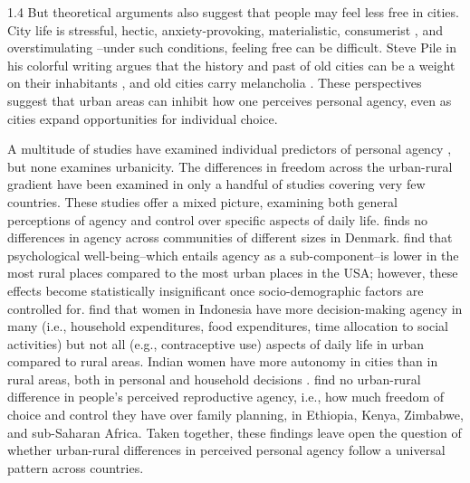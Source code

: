 \documentclass[10pt, letterpaper]{article}
\begin{document}
\begin{spacing}{1.4}
But theoretical arguments also suggest that people may feel less free in cities. City life is stressful, hectic, anxiety-provoking, materialistic, consumerist \citep{aokCityBook15}, and overstimulating \citep{simmel03,lederbogen11}--under such conditions, feeling free can be difficult.
Steve Pile in his colorful writing argues that the history and past of old cities can be a weight on their inhabitants \citep{pile05,pile05B,pile99}, and old cities carry melancholia \citep{pile05B}. %
 These perspectives suggest that urban areas can inhibit how one perceives personal agency, even as cities expand opportunities for individual choice.

A multitude of studies have examined individual predictors of personal agency %
  \citep[e.g.,][]{aok_free_from_to,pitlik2016free,nikolaev2016give}, but none examines urbanicity. %
 The differences in freedom across the urban-rural gradient have been examined in only a handful of studies covering very few countries. These studies offer a
 mixed picture, examining both general perceptions of agency and control over specific aspects of daily life. \citet{lolle2023differences} finds no differences in agency across communities of different sizes in Denmark. %
\citet{atherton2024rural} find that psychological well-being--which entails
agency as a sub-component--is lower in the most rural places compared to the
most urban places in the USA; however, these effects become statistically
insignificant once socio-demographic factors are controlled
for. \citet{kusnali2025rural} find that women in Indonesia have more
decision-making agency in many (i.e., household expenditures, food expenditures,
time allocation to social activities) but not all (e.g., contraceptive use)
aspects of daily life in urban compared to rural areas. Indian women have more
autonomy in cities than in rural areas, both in personal and household decisions
\citep{mishra2014relative}.  
\citet{baage2024attitudes,baage2026reproductive} 
 find no urban-rural difference in people's
perceived reproductive agency, i.e., how much freedom of choice and control they
have over family planning, in Ethiopia, Kenya, Zimbabwe,
 and sub-Saharan Africa. 
Taken together, these findings leave open the question of whether urban-rural
differences in perceived personal agency follow a universal pattern across
countries.



\end{spacing}
\end{document}
